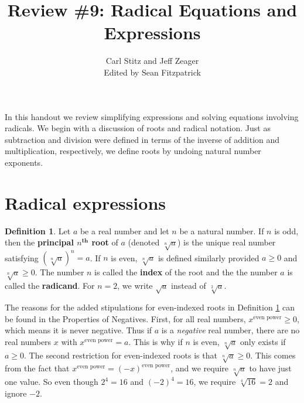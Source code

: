 \documentclass[11pt]{article}
\title{Review \#9: Radical Equations and Expressions}
\author{Carl Stitz and Jeff Zeager\\
Edited by Sean Fitzpatrick}
\theoremstyle{definition}  %
\newtheorem{defn}{\bf Definition}
\newcommand{\bbm}{\begin{boxedminipage}{6.41in}}
\newcommand{\ebm}{\end{boxedminipage}}
\begin{document}
\maketitle


\renewcommand{\headrulewidth}{0pt}
\renewcommand{\headheight}{14pt}
\lhead[\fancyplain{}{\sc\thepage}]%
      {\fancyplain{}{\sc \nouppercase{\rightmark}}}
\rhead[\fancyplain{}{\sc \nouppercase{\leftmark}}]%
      {\fancyplain{}{\sc\thepage}}
\cfoot{}


In this handout we review simplifying expressions and solving equations involving radicals.  
We begin with a discussion of roots and radical notation.  Just as subtraction and division were defined in terms of the inverse of addition and multiplication, respectively, we define roots by undoing natural number exponents.

\section{Radical expressions}

\colorbox{ResultColor}{\bbm

\begin{defn} \label{principalnthrootdefn} Let $a$ be a real number and let $n$ be a natural number.  If $n$ is odd, then the \textbf{principal \boldmath $n^{\textbf{th}}$ root} of $a$ (denoted $\sqrt[n]{a}$) is the unique real number satisfying $\left(\sqrt[n]{a}\right)^n = a$.  If $n$ is even, $\sqrt[n]{a}$ is defined similarly provided  $a \geq 0$ and $\sqrt[n]{a} \geq 0$.  The number $n$ is called the \textbf{index} of the root and the the number $a$ is called the \textbf{radicand}.  For $n=2$, we write $\sqrt{a}$ instead of $\sqrt[2]{a}$.

\end{defn}

\ebm}

\medskip

The reasons for the added stipulations for even-indexed roots in Definition \ref{principalnthrootdefn} can be found in the Properties of Negatives.  First, for all real numbers,  $x^{\text{even power}} \geq 0$, which means it is never negative.  Thus if $a$ is a \textit{negative} real number, there are no real numbers $x$ with $x^{\text{even power}} = a$.  This is why if $n$ is even, $\sqrt[n]{a}$ only exists if $a \geq 0$.  The second restriction for even-indexed roots is that $\sqrt[n]{a} \geq 0$.  This comes from the fact that $x^{\text{even power}} = (-x)^{\text{even power}}$, and we require $\sqrt[n]{a}$ to have just one value.  So even though $2^{4} = 16$ and $(-2)^{4} = 16$, we require $\sqrt[4]{16} = 2$ and ignore $-2$.  
\end{document}
